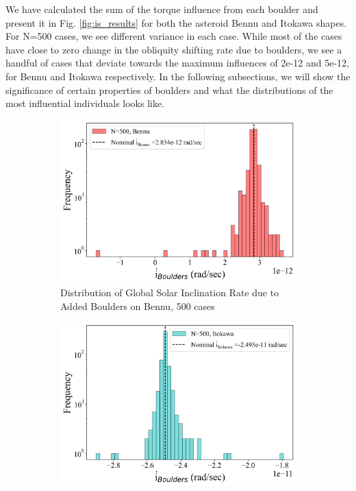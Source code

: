 We have calculated the sum of the torque influence from each boulder and present it in Fig. \ref{fig:is_results} for both the asteroid Bennu and Itokawa shapes. For N=500 cases, we see different variance in each case. While most of the cases have close to zero change in the obliquity shifting rate due to boulders, we see a handful of cases that deviate towards the maximum influences of 2e-12 and 5e-12, for Bennu and Itokawa respectively. In the following subsections, we will show the significance of certain properties of boulders and what the distributions of the most influential individuals looks like.

\begin{figure}
    \begin{subfigure}{0.49\textwidth}
        \centering
        \includegraphics[width=\textwidth]{fig/initial_obliq_dot_dist_bennu.png}
        \caption{Distribution of Global Solar Inclination Rate due to Added Boulders on Bennu, 500 cases}
    \end{subfigure}
    \hfill
    \begin{subfigure}{0.49\textwidth}
        \centering
        \includegraphics[width=\textwidth]{fig/initial_obliq_dot_dist_itokawa.png}

\end{subfigure}
\end{figure}
